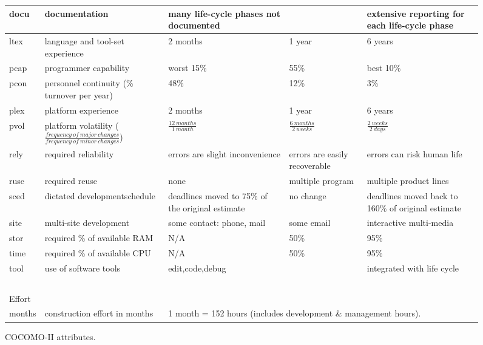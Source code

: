 \begin{figure*}[!t]
{\begin{center}
\begin{tabular}{|p{0.2in}|p{1.46in}|p{1.5in}|p{1.5in}|p{1.5in}|}
docu   &  documentation   & many life-cycle phases not
documented      & &  extensive reporting for each life-cycle phase\\\hline

ltex   &  language and tool-set experience   & 2 months  &  1
year & 6 years \\\hline

pcap   &  programmer capability  &  worst 15\%   & 55\%  &  best 10\% \\\hline


pcon   &  personnel continuity \newline
(\% turnover per year) &
    48\% &    12\%  & 3\% \\\hline

plex   &  platform experience  &  2 months  &  1 year  &  6 years\\\hline


pvol   &  platform volatility ($\frac{frequency~of~major~changes}{frequency~of~minor~changes}$) &
$\frac{12~months}{1~month}$   & $\frac{6~months}{2~weeks}$ &
$\frac{2~weeks}{2~days}$\\\hline



rely   &  required
reliability &   errors are slight inconvenience  &  errors are easily
recoverable   & errors can risk human life\\\hline




ruse   &  required
reuse &   none &    multiple program  & multiple product lines\\\hline

sced  &   dictated development\newline schedule &    deadlines moved to
75\% of the original estimate &  no change
&  deadlines moved back to  160\% of original estimate\\\hline

site   &  multi-site development   & some contact: phone, mail&
some email  &  interactive multi-media\\\hline

stor  &   required \% of available
RAM & N/A
 &   50\% &  95\% \\\hline


time  &   required \% of available CPU &
N/A&     50\%
   &  95\% \\\hline


tool   &  use of software tools  &  edit,code,debug &&
integrated with life cycle\\\hline

\multicolumn{1}{c}{~}\\

\multicolumn{5}{l}{Effort}\\\hline

months & construction effort  in months& \multicolumn{3}{l|}{1 month =  152 hours (includes development \& management
hours).  
}\\\hline
\end{tabular}
\end{center}
} \caption{COCOMO-II attributes.}
\label{fig:cparems}
\end{figure*}
